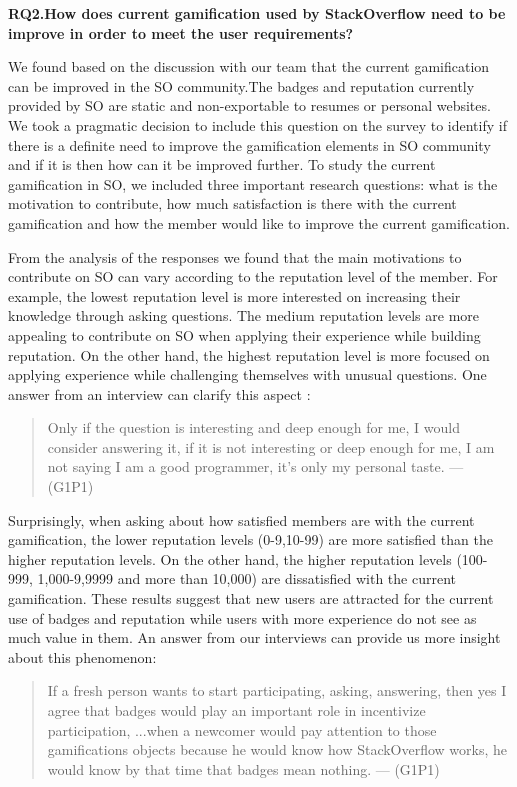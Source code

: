 \documentclass{sigchi}
\begin{document}
\textbf{RQ2.How does current gamification used by StackOverflow need to be improve in order to meet the user requirements?}

We found based on the discussion with our team that the current gamification can be improved in the SO community.The badges and reputation currently provided by SO are static and non-exportable to resumes or personal websites. We took a pragmatic decision to include this question on the survey to identify if there is a definite need to improve the gamification elements in SO community and if it is then how can it be improved further. To study the current gamification in SO, we included three important research questions: what is the motivation to contribute, how much satisfaction is there with the current gamification and how the member would like to improve the current gamification.

From the analysis of the responses we found that the main motivations to contribute on SO can vary according to the reputation level of the member. For example, the lowest reputation level is more interested on increasing their knowledge through asking questions. The medium reputation levels are more appealing to contribute on SO when applying their experience while building reputation. On the other hand, the highest reputation level is more focused on applying experience while challenging themselves with unusual questions. One answer from an interview can clarify this aspect :

\begin{quote}
Only if the question is interesting and deep enough for me, I would consider answering it, if it is not interesting or deep enough for me, I am not saying I am a good programmer, it’s only my personal taste. --- (G1P1)
\end{quote}

Surprisingly, when asking about how satisfied members are with the current gamification, the lower reputation levels (0-9,10-99) are more satisfied than the higher reputation levels. On the other hand, the higher  reputation levels (100-999, 1,000-9,9999 and more than 10,000) are dissatisfied with the current gamification.  These results suggest that new users are attracted for the current use of badges and reputation while users with more experience do not see as much value in them. An answer from our interviews can provide us more insight about this phenomenon:

\begin{quote}
If a fresh person wants to start participating, asking, answering, then yes I agree that badges would play an important role in incentivize participation, ...when a newcomer would pay attention to those gamifications objects because he would know how StackOverflow works, he would know by that time that badges mean nothing. --- (G1P1)
\end{quote}
\end{document}
